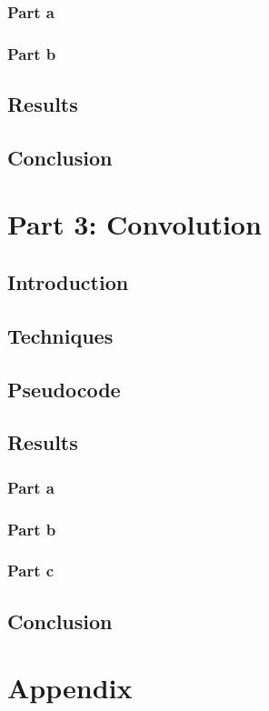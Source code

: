 \documentclass[a4paper]{article}
\begin{document}
	\subsubsection{Part a}
	\subsubsection{Part b}
	\subsection{Results}
	\subsection{Conclusion}
	\section{Part 3: Convolution}
	\subsection{Introduction}
	\subsection{Techniques}
	\subsection{Pseudocode}
	\subsection{Results}
	\subsubsection{Part a}
	\subsubsection{Part b}
	\subsubsection{Part c}
	\subsection{Conclusion}
	\section{Appendix}
\end{document}
